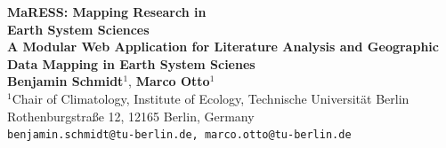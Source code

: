 \documentclass[a0,portrait]{a0poster}
\begin{document}
\null  %
\vfill

\begin{center}
	{\VeryHuge\color{tuberlinblue}\textbf{MaRESS: Mapping Research in \\ Earth System Sciences}}\\[1.5cm]
	{\Large\color{darkgray}\textbf{A Modular Web Application for Literature Analysis and Geographic Data Mapping in Earth System Scienes}}\\[0.8cm]

	{\large\color{tuberlinblue}
	\textbf{Benjamin Schmidt}$^1$, \textbf{Marco Otto}$^1$\\[0.3cm]
	$^1$Chair of Climatology, Institute of Ecology, Technische Universität Berlin\\
	Rothenburgstraße 12, 12165 Berlin, Germany\\[0.3cm]
	\texttt{benjamin.schmidt@tu-berlin.de, marco.otto@tu-berlin.de}
	}
\end{center}

\vspace{0.5cm}
\end{document}
